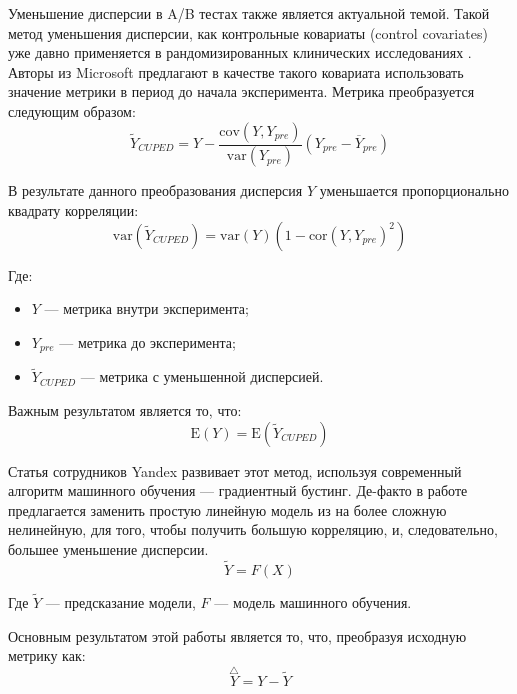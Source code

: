 \documentclass[../document.tex]{subfiles}
\begin{document}
	\par Уменьшение дисперсии в A/B тестах также является актуальной темой. Такой метод уменьшения дисперсии, как контрольные ковариаты (control covariates) уже давно применяется в рандомизированных клинических исследованиях \cite{cuped}. Авторы из Microsoft предлагают в качестве такого ковариата использовать значение метрики в период до начала эксперимента. Метрика преобразуется следующим образом:
	\begin{equation}
		\tilde{Y}_{CUPED}=Y-\frac{\text{cov}(Y,Y_{pre})}{\text{var}(Y_{pre})}(Y_{pre}-\overline{Y}_{pre})
	\end{equation}
	\par В результате данного преобразования дисперсия $Y$ уменьшается пропорционально квадрату корреляции:
	\begin{equation}
		\text{var}(\tilde{Y}_{CUPED})=\text{var}(Y)\left(1-\text{cor}(Y,Y_{pre})^2\right)
	\end{equation}
	\par Где:
	\begin{itemize}
		\item $Y$ --- метрика внутри эксперимента;
		\item $Y_{pre}$ --- метрика до эксперимента;
		\item $\tilde{Y}_{CUPED}$ --- метрика с уменьшенной дисперсией.
	\end{itemize}
	\par Важным результатом является то, что:
	\begin{equation}
		\text{E}(Y)=\text{E}(\tilde{Y}_{CUPED})
	\end{equation}
	\par Статья \cite{boosting_ab} сотрудников Yandex развивает этот метод, используя современный алгоритм машинного обучения --- градиентный бустинг. Де-факто в работе предлагается заменить простую линейную модель из \cite{cuped} на более сложную нелинейную, для того, чтобы получить большую корреляцию, и, следовательно, большее уменьшение дисперсии.
	\begin{equation}
		\tilde{Y}=F(X)
	\end{equation}
	\par Где $\tilde{Y}$ --- предсказание модели, $F$ --- модель машинного обучения.
	\par Основным результатом этой работы является то, что, преобразуя исходную метрику как:
	\begin{equation}
		\overset{\triangle}{Y}=Y-\tilde{Y}
	\end{equation}
\end{document}
